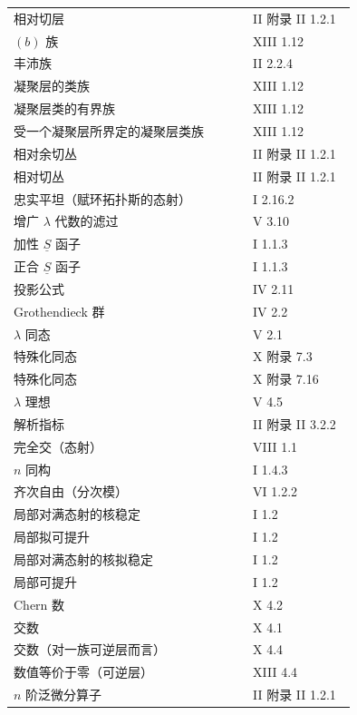 \begin{longtable}{@{}p{0.65\linewidth}p{0.29\linewidth}@{}}
相对切层 & II 附录 II 1.2.1\\
$(b)$ 族 & XIII 1.12\\
丰沛族 & II 2.2.4\\
凝聚层的类族 & XIII 1.12\\
凝聚层类的有界族 & XIII 1.12\\
受一个凝聚层所界定的凝聚层类族 & XIII 1.12\\
相对余切丛 & II 附录 II 1.2.1\\
相对切丛 & II 附录 II 1.2.1\\
忠实平坦（赋环拓扑斯的态射） & I 2.16.2\\
增广 $\lambda$ 代数的滤过 & V 3.10\\
加性 $\underline S$ 函子 & I 1.1.3\\
正合 $\underline S$ 函子 & I 1.1.3\\
投影公式 & IV 2.11\\[3pt]
Grothendieck 群 & IV 2.2\\[3pt]
$\lambda$ 同态 & V 2.1\\
特殊化同态 & X 附录 7.3\\
特殊化同态 & X 附录 7.16\\[3pt]
$\lambda$ 理想 & V 4.5\\
解析指标 & II 附录 II 3.2.2\\
完全交（态射） & VIII 1.1\\
$n$ 同构 & I 1.4.3\\[3pt]
齐次自由（分次模） & VI 1.2.2\\
局部对满态射的核稳定 & I 1.2\\
局部拟可提升 & I 1.2\\
局部对满态射的核拟稳定 & I 1.2\\
局部可提升 & I 1.2\\[3pt]
Chern 数 & X 4.2\\
交数 & X 4.1\\
交数（对一族可逆层而言） & X 4.4\\
数值等价于零（可逆层） & XIII 4.4\\[3pt]
$n$ 阶泛微分算子 & II 附录 II 1.2.1
\end{longtable}

